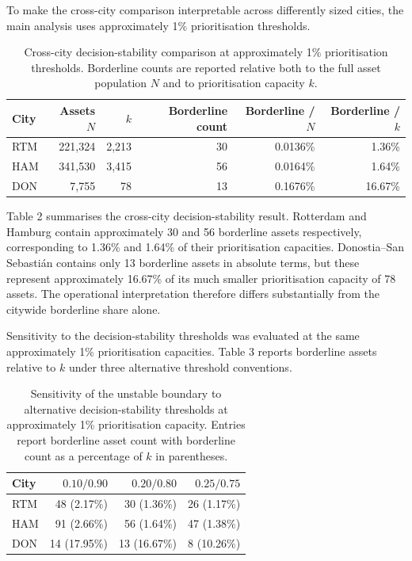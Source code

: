 \documentclass[
]{article}
\begin{document}
To make the cross-city comparison interpretable across differently sized
cities, the main analysis uses approximately 1\% prioritisation
thresholds.

\begin{table}[H]
\centering
\small
\begin{tabular}{lrrrrr}
\toprule
City & Assets $N$ & $k$ & Borderline count & Borderline / $N$ & Borderline / $k$ \\
\midrule
RTM & 221,324 & 2,213 & 30 & 0.0136\% & 1.36\% \\
HAM & 341,530 & 3,415 & 56 & 0.0164\% & 1.64\% \\
DON & 7,755 & 78 & 13 & 0.1676\% & 16.67\% \\
\bottomrule
\end{tabular}
\caption{Cross-city decision-stability comparison at approximately 1\% prioritisation thresholds. Borderline counts are reported relative both to the full asset population \(N\) and to prioritisation capacity \(k\).}
\end{table}

Table 2 summarises the cross-city decision-stability result. Rotterdam
and Hamburg contain approximately 30 and 56 borderline assets
respectively, corresponding to 1.36\% and 1.64\% of their prioritisation
capacities. Donostia--San Sebastián contains only 13 borderline assets
in absolute terms, but these represent approximately 16.67\% of its much
smaller prioritisation capacity of 78 assets. The operational
interpretation therefore differs substantially from the citywide
borderline share alone.

Sensitivity to the decision-stability thresholds was evaluated at the
same approximately 1\% prioritisation capacities. Table 3 reports
borderline assets relative to \(k\) under three alternative threshold
conventions.

\begin{table}[H]
\centering
\small
\begin{tabular}{lrrr}
\toprule
City & $0.10/0.90$ & $0.20/0.80$ & $0.25/0.75$ \\
\midrule
RTM & 48 (2.17\%) & 30 (1.36\%) & 26 (1.17\%) \\
HAM & 91 (2.66\%) & 56 (1.64\%) & 47 (1.38\%) \\
DON & 14 (17.95\%) & 13 (16.67\%) & 8 (10.26\%) \\
\bottomrule
\end{tabular}
\caption{Sensitivity of the unstable boundary to alternative decision-stability thresholds at approximately 1\% prioritisation capacity. Entries report borderline asset count with borderline count as a percentage of \(k\) in parentheses.}
\end{table}
\end{document}
